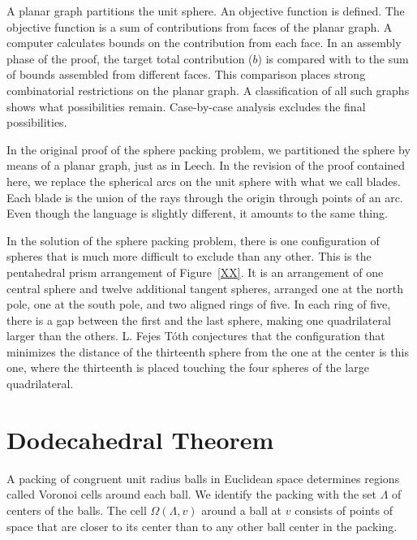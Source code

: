{\it

A planar graph partitions the
unit sphere.  An objective function is defined.
The objective function is a sum
of contributions from  faces of the planar graph.  
A computer calculates bounds
on the contribution from each face.  In an assembly phase of the proof, 
the target total contribution ($b$) is compared
with to the sum of bounds assembled from different faces. 
This comparison places
strong combinatorial restrictions on the planar graph.  
A classification of all 
such graphs shows what possibilities remain.  
Case-by-case analysis excludes the final possibilities.

}

In the original proof of the sphere packing problem, we partitioned the sphere
by means of a planar graph, just as in Leech.  In the revision of the proof contained
here,  we replace the spherical arcs on the unit sphere with what we call blades.
Each blade is the union of the rays through the origin through points of an arc.
Even though the language is slightly different, it amounts to the same thing.


In the solution of the sphere packing problem, there is one configuration
of spheres that is much more difficult to exclude than any other.  This
is the pentahedral prism arrangement of Figure~\ref{XX}.  %
It is an arrangement of one central sphere and twelve additional tangent
spheres, arranged one at the north pole, one at the south pole, and two
aligned rings of five.  In each ring of five, there is a gap between the
first and the last sphere, making one quadrilateral larger than the others.
L. Fejes T\'oth conjectures that the configuration that minimizes
the distance of the thirteenth sphere from the one at the center is this one,
where the thirteenth is placed touching the four spheres of the large
quadrilateral.



\clearpage
\section{Dodecahedral Theorem}

A packing of congruent unit radius balls 
in Euclidean space determines regions called Voronoi cells around each ball.  
We identify the packing with the set $\Lambda$ of centers of the balls.  The
cell $\Omega(\Lambda,v)$ around a ball at $v$ 
consists of points of space that are closer to its center than
to any other ball center in the packing.

